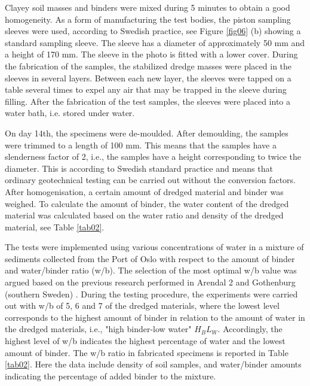 \documentclass[information,article,submit,pdftex,moreauthors]{Definitions/mdpi}
\begin{document}
Clayey soil masses and binders were mixed during 5 minutes to obtain a good homogeneity. As a form of manufacturing the test bodies, the piston sampling sleeves were used, according to Swedish practice, see Figure \ref{fig06} (b) showing a standard sampling sleeve. The sleeve has a diameter of approximately 50 mm and a height of 170 mm. The sleeve in the photo is fitted with a lower cover. During the fabrication of the samples, the stabilized dredge masses were placed in the sleeves in several layers. Between each new layer, the sleeves were tapped on a table several times to expel any air that may be trapped in the sleeve during filling. After the fabrication of the test samples, the sleeves were placed into a water bath, i.e. stored under water. 

On day 14th, the specimens were de-moulded. After demoulding, the samples were trimmed to a length of 100 mm. This means that the samples have a slenderness factor of 2, i.e., the samples have a height corresponding to twice the diameter. This is according to Swedish standard practice and means that ordinary geotechnical testing can be carried out without the conversion factors. After homogenisation, a certain amount of dredged material and binder was weighed. To calculate the amount of binder, the water content of the dredged material was calculated based on the water ratio and density of the dredged material, see Table \ref{tab02}.

The tests were implemented using various concentrations of water in a mixture of sediments collected from the Port of Oslo with respect to the amount of binder and water/binder ratio (w/b). The selection of the most optimal w/b value was argued based on the previous research performed in Arendal 2 and Gothenburg (southern Sweden) \cite{Lemenkova202139}. During the testing procedure, the experiments were carried out with w/b of 5, 6 and 7 of the dredged materials, where the lowest level corresponds to the highest amount of binder in relation to the amount of water in the dredged materials, i.e., "high binder-low water" $H_BL_W$. Accordingly, the highest level of w/b indicates the highest percentage of water and the lowest amount of binder. The w/b ratio  in fabricated specimens is reported in Table \ref{tab02}. Here the data include density of soil samples, and water/binder amounts indicating the percentage of added binder to the mixture. 
\end{document}
